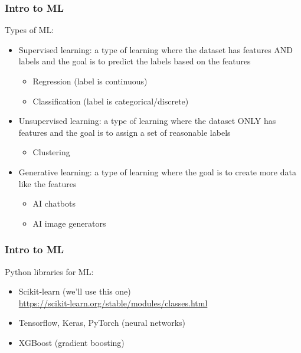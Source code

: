 \documentclass{beamer}
\begin{document}
\begin{frame}	
	\frametitle{Intro to ML}
	
	\begin{block}{Types of ML:}
		\footnotesize
		\begin{itemize}%
			\item Supervised learning: a type of learning where the dataset has features AND labels and the goal is to predict the labels based on the features 
			\begin{itemize}
				\item Regression (label is continuous)
				\item Classification (label is categorical/discrete)
			\end{itemize}
			\item Unsupervised learning: a type of learning where the dataset ONLY has features and the goal is to assign a set of reasonable labels
			\begin{itemize}
				\item Clustering
			\end{itemize}
			\item Generative learning: a type of learning where the goal is to create more data like the features
			\begin{itemize}
				\item AI chatbots
				\item AI image generators
			\end{itemize}
		\end{itemize}
	\end{block}
	
\end{frame}

\begin{frame}	
	\frametitle{Intro to ML}
	
	\begin{block}{Python libraries for ML:}
		\begin{itemize}%
			\item Scikit-learn (we'll use this one) \\
			\url{https://scikit-learn.org/stable/modules/classes.html}
			\item Tensorflow, Keras, PyTorch (neural networks)
			\item XGBoost (gradient boosting)
		\end{itemize}
	\end{block}
	
\end{frame}
\end{document}
